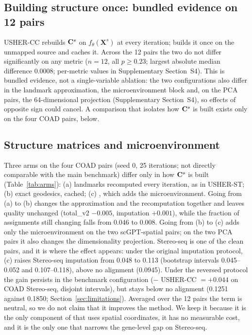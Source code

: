 \subsection{Building structure once: bundled evidence on 12 pairs}\label{sec:res_once}
USHER-CC rebuilds $\mathbf{C}^{s}$ on $f_\theta(\mathbf{X}^{s})$ at every iteration; \frost builds it once on the unmapped source
and caches it. Across the 12 pairs the two do not differ significantly on any metric ($n=12$, all $p\ge0.23$; largest absolute
median difference 0.0008; per-metric values in Supplementary Section~S4). This is bundled evidence, not a
single-variable ablation: the two configurations also differ in the landmark approximation, the microenvironment
block and, on the PCA pairs, the 64-dimensional projection (Supplementary Section~S4), so effects of opposite sign could cancel. A
comparison that isolates how $\mathbf{C}^{s}$ is built exists only on the four COAD pairs, below.

\subsection{Structure matrices and microenvironment}\label{sec:res_niche}
Three arms on the four COAD pairs (seed 0, 25 iterations; not directly comparable with the main benchmark) differ
only in how $\mathbf{C}^{s}$ is built (Table~\ref{tab:arms}): (a) landmarks recomputed every iteration, as in USHER-ST; (b) exact
geodesics, cached; (c) \frost, which adds the microenvironment. Going from (a) to (b) changes the approximation and the
recomputation together and leaves quality unchanged (total\_v2 $-0.005$, imputation $+0.001$), while the fraction of
assignments still changing falls from 0.046 to 0.008. Going from (b) to (c) adds only the microenvironment on the two
scGPT-spatial pairs; on the two PCA pairs it also changes the dimensionality projection. Stereo-seq is one of the
clean pairs, and it is where the effect appears: under the original imputation protocol, (c) raises Stereo-seq
imputation from 0.048 to 0.113 (bootstrap intervals 0.045--0.052 and 0.107--0.118), above no alignment (0.0945). Under the reversed
protocol the gain persists in the benchmark configuration (\frost $-$ USHER-CC $=+0.044$ on COAD Stereo-seq,
disjoint intervals), but \frost stays below no alignment (0.1251 against 0.1850; Section~\ref{sec:limitations}).
Averaged over the 12 pairs the term is neutral, so we do not claim that it improves the method. We keep it because it
is the only component of \frost that uses spatial coordinates, it has no measurable cost, and it is the only one that
narrows the gene-level gap on Stereo-seq.

